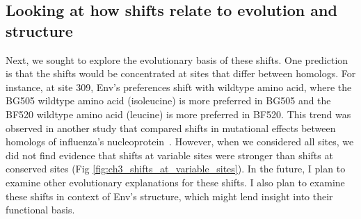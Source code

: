\documentclass[9pt,lineno]{elife}
\begin{document}
\subsection*{Looking at how shifts relate to evolution and structure}

Next, we sought to explore the evolutionary basis of these shifts.
One prediction is that the shifts would be concentrated at sites that differ between homologs.
For instance, at site 309, Env's preferences shift with wildtype amino acid, where the BG505 wildtype amino acid (isoleucine) is more preferred in BG505 and the BF520 wildtype amino acid (leucine) is more preferred in BF520.
This trend was observed in another study that compared shifts in mutational effects between homologs of influenza's nucleoprotein~\cite{doud2015site}.
However, when we considered all sites, we did not find evidence that shifts at variable sites were stronger than shifts at conserved sites (Fig \ref{fig:ch3_shifts_at_variable_sites}).
In the future, I plan to examine other evolutionary explanations for these shifts.
I also plan to examine these shifts in context of Env's structure, which might lend insight into their functional basis.
\end{document}
